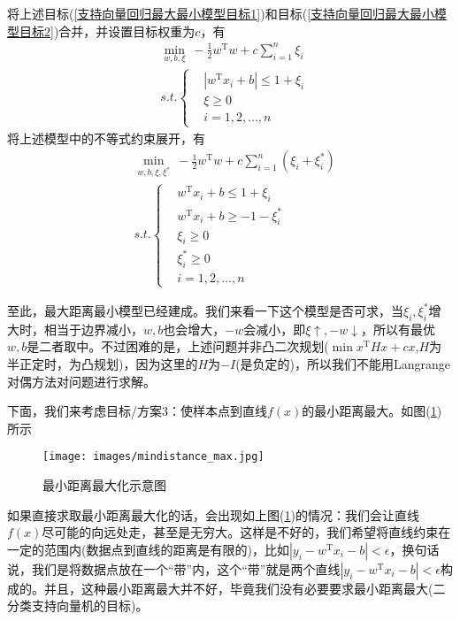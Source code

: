     将上述目标(\ref{支持向量回归最大最小模型目标1})和目标(\ref{支持向量回归最大最小模型目标2})合并，并设置目标权重为$c$，有
    \begin{align*}
    & \min_{w,b,\xi} \ -\frac{1}{2}w^\mathrm{T}w +c \sum_{i=1}^n \xi_i\\
    & s.t.\left\{
    \begin{aligned}
    & |w^\mathrm{T}x_i+b| \leqslant 1+\xi_i\\
    & \xi \geqslant 0\\
    & i=1,2,\dots,n
    \end{aligned}
    \right.
    \end{align*}
    将上述模型中的不等式约束展开，有
    \begin{align*}
    & \min_{w,b,\xi,\xi^*} \ -\frac{1}{2}w^\mathrm{T}w +c \sum_{i=1}^n( \xi_i+\xi_i^*)\\
    & s.t.\left\{
    \begin{aligned}
    & w^\mathrm{T}x_i+b \leqslant 1+\xi_i\\
    & w^\mathrm{T}x_i+b \geqslant -1-\xi_i^*\\
    & \xi_i \geqslant 0\\
    & \xi_i^* \geqslant 0\\
    & i=1,2,\dots,n
    \end{aligned}
    \right.
    \end{align*}
    \par
    至此，最大距离最小模型已经建成。我们来看一下这个模型是否可求，当$\xi_i,\xi_i^*$增大时，相当于边界减小，$w,b$也会增大，$-w$会减小，即$\xi \uparrow,-w\downarrow$，所以有最优$w,b$是二者取中。不过困难的是，上述问题并非凸二次规划($\min x^\mathrm{T}Hx+cx$,$H$为半正定时，为凸规划)，因为这里的$H$为$-I$(是负定的)，所以我们不能用Langrange对偶方法对问题进行求解。
    \par
    下面，我们来考虑目标/方案3：使样本点到直线$f(x)$的最小距离最大。如图(\ref{最小距离最大化示意图})所示
            \begin{figure}[H]
            \centering
            \texttt{[image: images/mindistance\_max.jpg]}
            \caption{最小距离最大化示意图}
            \label{最小距离最大化示意图}
            \end{figure}
    如果直接求取最小距离最大化的话，会出现如上图(\ref{最小距离最大化示意图})的情况：我们会让直线$f(x)$尽可能的向远处走，甚至是无穷大。这样是不好的，我们希望将直线约束在一定的范围内(数据点到直线的距离是有限的)，比如$|y_i - w^\mathrm{T}x_i-b| < \epsilon$，换句话说，我们是将数据点放在一个“带”内，这个“带”就是两个直线$|y_i - w^\mathrm{T}x_i-b| < \epsilon$构成的。并且，这种最小距离最大并不好，毕竟我们没有必要要求最小距离最大(二分类支持向量机的目标)。
